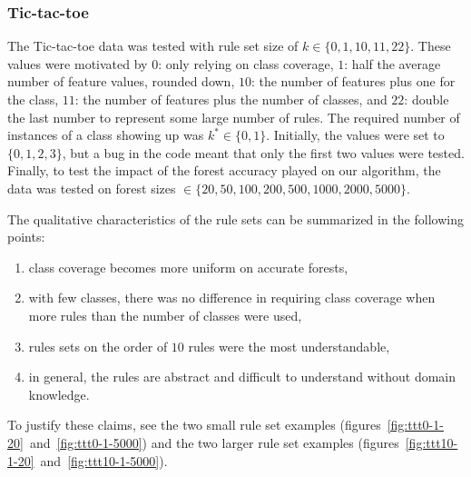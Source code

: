 \documentclass[11pt]{article}
\begin{document}
\subsubsection{Tic-tac-toe}
The Tic-tac-toe data was tested with rule set size of $k \in \{0, 1, 10, 11, 22\}$. These values were motivated by $0$: only relying on class coverage, $1$: half the average number of feature values, rounded down, $10$: the number of features plus one for the class, $11$: the number of features plus the number of classes, and $22$: double the last number to represent some large number of rules. The required number of instances of a class showing up was $k^* \in \{0,1\}$. Initially, the values were set to $\{0,1,2,3\}$, but a bug in the code meant that only the first two values were tested. Finally, to test the impact of the forest accuracy played on our algorithm, the data was tested on forest sizes $\in \{20, 50, 100, 200, 500, 1000, 2000, 5000\}$. 

The qualitative characteristics of the rule sets can be summarized in the following points:
\begin{enumerate}
\item class coverage becomes more uniform on accurate forests,
\item with few classes, there was no difference in requiring class coverage when more rules than the number of classes were used, 
\item rules sets on the order of $10$ rules were the most understandable,
\item in general, the rules are abstract and difficult to understand without domain knowledge.
\end{enumerate}
To justify these claims, see the two small rule set examples (figures~\ref{fig:ttt0-1-20}~and~\ref{fig:ttt0-1-5000}) and the two larger rule set examples (figures~\ref{fig:ttt10-1-20}~and~\ref{fig:ttt10-1-5000}). 
\end{document}
